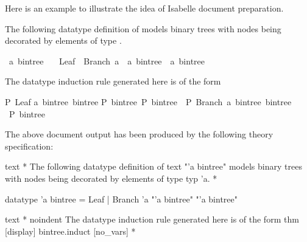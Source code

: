 \begin{isabellebody}
\begin{isamarkuptext}
  Here is an example to illustrate the idea of Isabelle document
  preparation.

  \bigskip The following datatype definition of 
  models binary trees with nodes being decorated by elements of type
  .%
\end{isamarkuptext}%
\isamarkuptrue%
\ {\isacharprime}a\ bintree\ {\isacharequal}\isanewline
\ \ Leaf\ {\isacharbar}\ Branch\ {\isacharprime}a\ \ {\isachardoublequote}{\isacharprime}a\ bintree{\isachardoublequote}\ \ {\isachardoublequote}{\isacharprime}a\ bintree{\isachardoublequote}\isamarkupfalse%
%
\begin{isamarkuptext}%
\noindent The datatype induction rule generated here is of the form
  \begin{isabelle}%
{\isasymlbrakk}P\ Leaf{\isacharsemicolon}\isanewline
\isaindent{\ \ \ }{\isasymAnd}a\ bintree{}\ bintree{}{\isachardot}\isanewline
\isaindent{\ \ \ \ \ \ }{\isasymlbrakk}P\ bintree{}{\isacharsemicolon}\ P\ bintree{}{\isasymrbrakk}\ {\isasymLongrightarrow}\ P\ {\isacharparenleft}Branch\ a\ bintree{}\ bintree{}{\isacharparenright}{\isasymrbrakk}\isanewline
{\isasymLongrightarrow}\ P\ bintree%
\end{isabelle}

  \bigskip The above document output has been produced by the
  following theory specification:

  \begin{ttbox}
  text {\ttlbrace}*
    The following datatype definition of {\at}{\ttlbrace}text "'a bintree"{\ttrbrace}
    models binary trees with nodes being decorated by elements
    of type {\at}{\ttlbrace}typ 'a{\ttrbrace}.
  *{\ttrbrace}

  datatype 'a bintree =
    Leaf | Branch 'a  "'a bintree"  "'a bintree"

  text {\ttlbrace}*
    {\ttback}noindent The datatype induction rule generated here is
    of the form {\at}{\ttlbrace}thm [display] bintree.induct [no_vars]{\ttrbrace}
  *{\ttrbrace}
  \end{ttbox}


\end{isamarkuptext}
\end{isabellebody}
